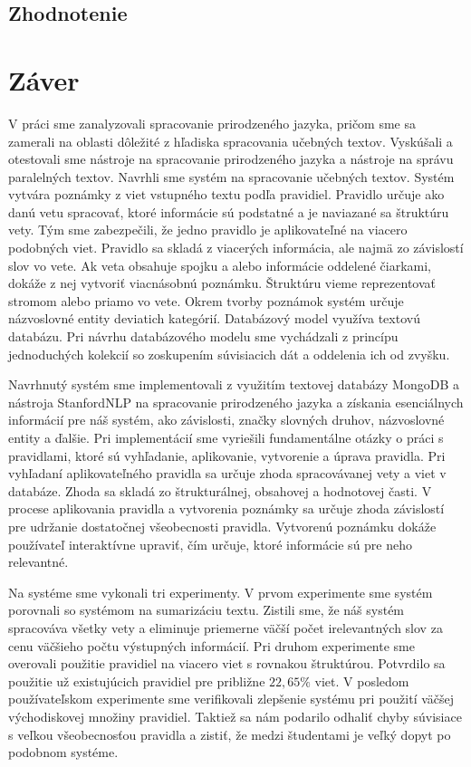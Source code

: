 \newpage
{}
{
	\section{Zhodnotenie}
}
{
	\chapter{Záver}
}
\label{conclusions}
V práci sme zanalyzovali spracovanie prirodzeného jazyka, pričom sme sa zamerali na oblasti dôležité z hľadiska spracovania učebných textov. Vyskúšali a otestovali sme nástroje na spracovanie prirodzeného jazyka a nástroje na správu paralelných textov. Navrhli sme systém na spracovanie učebných textov. Systém vytvára poznámky z viet vstupného textu podľa pravidiel. Pravidlo určuje ako danú vetu spracovať, ktoré informácie sú podstatné a je naviazané sa štruktúru vety. Tým sme zabezpečili, že jedno pravidlo je aplikovateľné na viacero podobných viet. Pravidlo sa skladá z viacerých informácia, ale najmä zo závislostí slov vo vete. Ak veta obsahuje spojku a alebo informácie oddelené čiarkami, dokáže z nej vytvoriť viacnásobnú poznámku.  Štruktúru vieme reprezentovať stromom alebo priamo vo vete. Okrem tvorby poznámok systém určuje názvoslovné entity deviatich kategórií. Databázový model využíva textovú databázu. Pri návrhu databázového modelu sme vychádzali z princípu jednoduchých kolekcií so zoskupením súvisiacich dát a oddelenia ich od zvyšku.

Navrhnutý systém sme implementovali z využitím textovej databázy MongoDB a nástroja StanfordNLP na spracovanie prirodzeného jazyka a získania esenciálnych informácií pre náš systém, ako závislosti, značky slovných druhov, názvoslovné entity a ďalšie. Pri implementácií sme vyriešili fundamentálne otázky o práci s pravidlami, ktoré sú vyhľadanie, aplikovanie, vytvorenie a úprava pravidla. Pri vyhľadaní aplikovateľného pravidla sa určuje zhoda spracovávanej vety a viet v databáze. Zhoda sa skladá zo štrukturálnej, obsahovej a hodnotovej časti. V procese aplikovania pravidla a vytvorenia poznámky sa určuje zhoda závislostí pre udržanie dostatočnej všeobecnosti pravidla. Vytvorenú poznámku dokáže používateľ interaktívne upraviť, čím určuje, ktoré informácie sú pre neho relevantné.

Na systéme sme vykonali tri experimenty. V prvom experimente sme systém porovnali so systémom na sumarizáciu textu. Zistili sme, že náš systém spracováva všetky vety a eliminuje priemerne väčší počet irelevantných slov za cenu väčšieho počtu výstupných informácií. Pri druhom experimente sme overovali použitie pravidiel na viacero viet s rovnakou štruktúrou. Potvrdilo sa použitie už existujúcich pravidiel pre približne $22,65\%$ viet. V posledom používateľskom experimente sme verifikovali zlepšenie systému pri použití väčšej východiskovej množiny pravidiel. Taktiež sa nám podarilo odhaliť chyby súvisiace s veľkou všeobecnosťou pravidla a zistiť, že medzi študentami je veľký dopyt po podobnom systéme.

